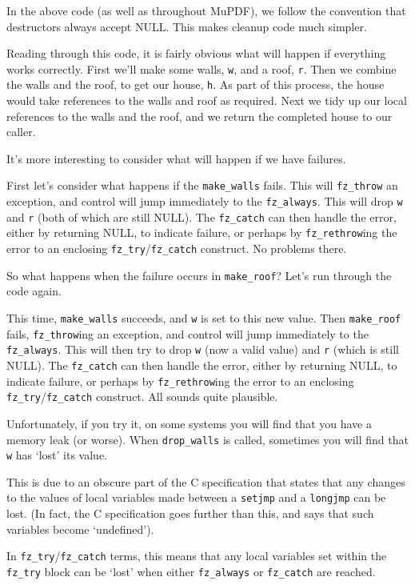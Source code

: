 \documentclass[oneside]{book}
\begin{document}
In the above code (as well as throughout MuPDF), we follow the convention that destructors always accept NULL. This makes cleanup code much simpler.

Reading through this code, it is fairly obvious what will happen if everything works correctly. First we'll make some walls, \texttt{w}, and a roof, \texttt{r}. Then we combine the walls and the roof, to get our house, \texttt{h}. As part of this process, the house would take references to the walls and roof as required. Next we tidy up our local references to the walls and the roof, and we return the completed house to our caller.

It's more interesting to consider what will happen if we have failures.

First let's consider what happens if the \texttt{make\_walls} fails. This will \texttt{fz\_throw} an exception, and control will jump immediately to the \texttt{fz\_always}. This will drop \texttt{w} and \texttt{r} (both of which are still NULL). The \texttt{fz\_catch} can then handle the error, either by returning NULL, to indicate failure, or perhaps by \texttt{fz\_rethrow}ing the error to an enclosing \texttt{fz\_try}\slash \texttt{fz\_catch} construct. No problems there.

So what happens when the failure occurs in \texttt{make\_roof}? Let's run through the code again.

This time, \texttt{make\_walls} succeeds, and \texttt{w} is set to this new value. Then \texttt{make\_roof} fails, \texttt{fz\_throw}ing an exception, and control will jump immediately to the \texttt{fz\_always}. This will then try to drop \texttt{w} (now a valid value) and \texttt{r} (which is still NULL). The \texttt{fz\_catch} can then handle the error, either by returning NULL, to indicate failure, or perhaps by \texttt{fz\_rethrow}ing the error to an enclosing \texttt{fz\_try}\slash\texttt{fz\_catch} construct. All sounds quite plausible.

Unfortunately, if you try it, on some systems you will find that you have a memory leak (or worse). When \texttt{drop\_walls} is called, sometimes you will find that \texttt{w} has `lost' its value.

This is due to an obscure part of the C specification that states that any changes to the values of local variables made between a \texttt{setjmp} and a \texttt{longjmp} can be lost. (In fact, the C specification goes further than this, and says that such variables become `undefined').

In \texttt{fz\_try}\slash \texttt{fz\_catch} terms, this means that any local variables set within the \texttt{fz\_try} block can be `lost' when either \texttt{fz\_always} or \texttt{fz\_catch} are reached.
\end{document}
